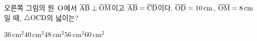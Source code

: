 \noindent\begin{minipage}[t]{0.58\linewidth}\vspace{0pt}\raggedright 오른쪽 그림의 원~$\mathrm{O}$에서 $\overline{\mathrm{AB}}\perp\overline{\mathrm{OM}}$이고 $\overline{\mathrm{AB}}=\overline{\mathrm{CD}}$이다. $\overline{\mathrm{OD}}=10\,\mathrm{cm}$, $\overline{\mathrm{OM}}=8\,\mathrm{cm}$일 때, $\triangle\mathrm{OCD}$의 넓이는?\end{minipage}\hfill\begin{minipage}[t]{0.4\linewidth}\vspace{0pt}\centering \resizebox{\ifdim\width>\linewidth\linewidth\else\width\fi}{!}{}\end{minipage}\par
\begin{choicesii}{$36\,\mathrm{cm}^2$}{$40\,\mathrm{cm}^2$}{$48\,\mathrm{cm}^2$}{$56\,\mathrm{cm}^2$}{$60\,\mathrm{cm}^2$}\end{choicesii}

